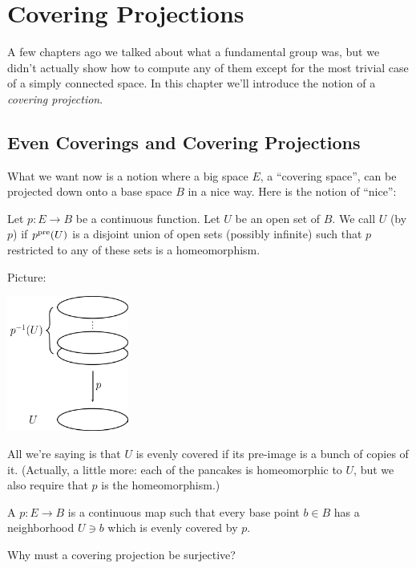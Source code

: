 \chapter{Covering Projections}

A few chapters ago we talked about what a fundamental group was,
but we didn't actually show how to compute any of them
except for the most trivial case of a simply connected space.
In this chapter we'll introduce the notion of a \emph{covering projection}.

\section{Even Coverings and Covering Projections}
What we want now is a notion where a big space $E$, a ``covering space'',
can be projected down onto a base space $B$ in a nice way.
Here is the notion of ``nice'':
\begin{definition}
	Let $p : E \to B$ be a continuous function.
	Let $U$ be an open set of $B$.
	We call $U$  (by $p$) if $p^{\text{pre}}(U)$ is a disjoint union of open sets (possibly infinite) such that $p$ restricted to any of these sets is a homeomorphism.  
\end{definition}
Picture:
\begin{center}
	\includegraphics[width=4cm]{media/even-covering.png}
\end{center}
All we're saying is that $U$ is evenly covered if its pre-image
is a bunch of copies of it. (Actually, a little more: each of the pancakes is homeomorphic to $U$, but we also require that $p$ is the homeomorphism.)

\begin{definition}
	A  $p : E \to B$
	is a continuous map such that every base point $b \in B$
	has a neighborhood $U \ni b$ which is evenly covered by $p$.
\end{definition}
\begin{ques}
	Why must a covering projection be surjective?
\end{ques}

